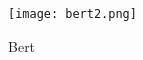 \begin{figure}[h]
  \centering
  \texttt{[image: bert2.png]}\\
  \caption{Bert}
  \label{fig:bert}
\end{figure}


\begin{comment}
\begin{figure}[h]
  \centering
  \texttt{[image: bert.png]}\\
  \caption{Bert}
  \label{fig:bert}
\end{figure}
\end{comment}

\begin{comment}
Generally, there are two main categories of log sequence anomalies: sequential and quantitative anomalies \cite{meng2019loganomaly}. Programs are usually executed according to static sequences, and the order of the respective log statements that are being produced, is a result of these executions. A sequential anomaly occurred, when a given sequence departs from a pattern that has been defined as normal. Works in this area include DeepLog \cite{du2017deeplog}.
Additionally, program executions have constant linear relationships - these can be captured by the quantitative relationships of logs. If these relationships are not met under all circumstances, an anomaly has occurred. Existing works in the area include PCA based approaches over log message counter \cite{xu2010robust} \cite{xu2009detecting} and LogClustering \cite{lin2016log}, but there are also deep learning based approaches to learn sequences of logs, like DeepLog \cite{du2017deeplog}. The main limitation of these approaches is that they use log event template indices as input to predict sequences. 


\end{comment}
